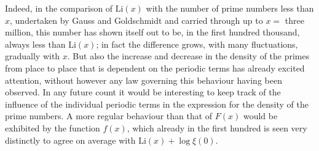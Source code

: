 \documentclass[12pt]{article}
\begin{document}
Indeed, in the comparison of $\text{Li}(x)$ with the number of prime numbers less than $x$, undertaken by Gauss and Goldschmidt and carried through up to $x =$ three million, this number has shown itself out to be, in the first hundred thousand, always less than $\text{Li}(x)$; in fact the difference grows, with many fluctuations, gradually with $x$. But also the increase and decrease in the density of the primes from place to place that is dependent on the periodic terms has already excited attention, without however any law governing this behaviour having been observed. In any future count it would be interesting to keep track of the influence of the individual periodic terms in the expression for the density of the prime numbers. A more regular behaviour than that of $F(x)$ would be exhibited by the function $f(x)$, which already in the first hundred is seen very distinctly to agree on average with $\text{Li}(x) + \log \xi(0)$.
\end{document}
